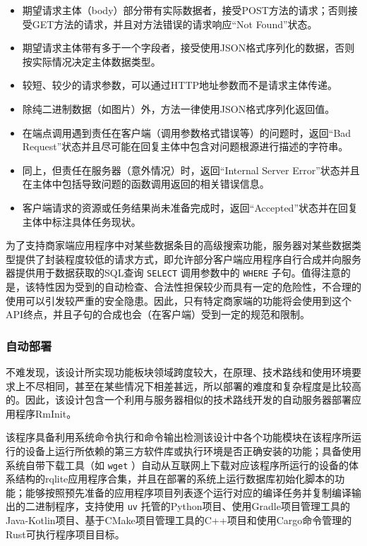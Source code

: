 \begin{itemize}
	\item 期望请求主体（body）部分带有实际数据者，接受POST方法的请求；否则接受GET方法的请求，并且对方法错误的请求响应“Not Found”状态。
	\item 期望请求主体带有多于一个字段者，接受使用JSON格式序列化的数据，否则按实际情况决定主体数据类型。
	\item 较短、较少的请求参数，可以通过HTTP地址参数而不是请求主体传递。
	\item 除纯二进制数据（如图片）外，方法一律使用JSON格式序列化返回值。
	\item 在端点调用遇到责任在客户端（调用参数格式错误等）的问题时，返回“Bad Request”状态并且尽可能在回复主体中包含对问题根源进行描述的字符串。
	\item 同上，但责任在服务器（意外情况）时，返回“Internal Server Error”状态并且在主体中包括导致问题的函数调用返回的相关错误信息。
	\item 客户端请求的资源或任务结果尚未准备完成时，返回“Accepted”状态并在回复主体中标注具体任务现状。
\end{itemize}

为了支持商家端应用程序中对某些数据条目的高级搜索功能，服务器对某些数据类型提供了封装程度较低的请求方式，即允许部分客户端应用程序自行合成并向服务器提供用于数据获取的SQL查询 \verb|SELECT| 调用参数中的 \verb|WHERE| 子句。值得注意的是，该特性因为受到的自动检查、合法性担保较少而具有一定的危险性，不合理的使用可以引发较严重的安全隐患。因此，只有特定商家端的功能将会使用到这个API终点，并且子句的合成也会（在客户端）受到一定的规范和限制。

\subsubsection{自动部署}
不难发现，该设计所实现功能板块领域跨度较大，在原理、技术路线和使用环境要求上不尽相同，甚至在某些情况下相差甚远，所以部署的难度和复杂程度是比较高的。因此，该设计包含一个利用与服务器相似的技术路线开发的自动服务器部署应用程序RmInit。

该程序具备利用系统命令执行和命令输出检测该设计中各个功能模块在该程序所运行的设备上运行所依赖的第三方软件库或执行环境是否正确安装的功能；具备使用系统自带下载工具（如 \verb|wget| ）自动从互联网上下载对应该程序所运行的设备的体系结构的rqlite应用程序合集，并且在部署的系统上运行数据库初始化脚本的功能；能够按照预先准备的应用程序项目列表逐个运行对应的编译任务并复制编译输出的二进制程序，支持使用 \verb|uv| 托管的Python项目、使用Gradle项目管理工具的Java-Kotlin项目、基于CMake项目管理工具的C++项目和使用Cargo命令管理的Rust可执行程序项目目标。

